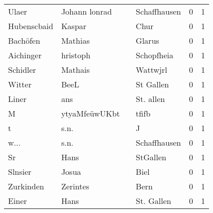 \begin{center}
\begin{tiny}
\begin{longtabu}{llllrr}
                    Ulaer &                      Johann lonrad &             &                                Schaffhausen &          0 &         1 \\
              Hubenscbaid &                             Kaspar &             &                                        Chur &          0 &         1 \\
                 Bachöfen &                            Mathias &             &                                      Glarus &          0 &         1 \\
                Aichinger &                           hristoph &             &                                  Schopfheia &          0 &         1 \\
                 Schidler &                            Mathais &             &                                    Wattwjrl &          0 &         1 \\
                   Witter &                               BeeL &             &                                   St Gallen &          0 &         1 \\
                    Liner &                                ans &             &                                   St. allen &          0 &         1 \\
                        M &                      ytyaMfeüwUKbt &             &                                       tfifb &          0 &         1 \\
                        t &                               s.n. &             &                                           J &          0 &         1 \\
                     w... &                               s.n. &             &                                Schaffhausen &          0 &         1 \\
                       Sr &                               Hans &             &                                    StGallen &          0 &         1 \\
                  Slnsier &                              Josua &             &                                        Biel &          0 &         1 \\
                Zurkinden &                           Zerintes &             &                                        Bern &          0 &         1 \\
                    Einer &                               Hans &             &                                  St. Gallen &          0 &         1 \\

\end{longtabu}
\end{tiny}
\end{center}

